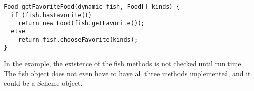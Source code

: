 \documentclass[12pt]{article}	%
\begin{document}
\begin{verbatim}
Food getFavoriteFood(dynamic fish, Food[] kinds) {
  if (fish.hasFavorite())
    return new Food(fish.getFavorite());
  else
    return fish.chooseFavorite(kinds);
}
\end{verbatim}

In the example, the existence of the fish methods is not checked until run time. The fish object does not even have to have all three methods implemented, and it could be a Scheme object.
\end{document}
